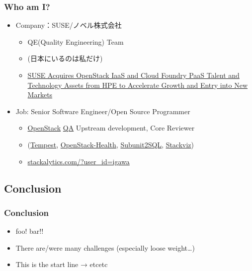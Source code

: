 \documentclass[aspectratio=169,11pt,hyperref={colorlinks=true}]{beamer}
\begin{document}
\begin{frame}
  \frametitle{Who am I?}
  \begin{itemize}
    \item Company：SUSE/ノベル株式会社
      \begin{itemize}
        \item QE(Quality Engineering) Team
        \item[] (日本にいるのは私だけ)
        \item \href{https://www.suse.com/newsroom/post/2016/suse-acquires-openstack-iaas-and-cloud-foundry-paas-talent-and-technology-assets-from-hpe-to-accelerate-growth-and-entry-into-new-markets/}{SUSE Acquires OpenStack IaaS and Cloud Foundry PaaS Talent and Technology Assets from HPE to Accelerate Growth and Entry into New Markets}
      \end{itemize}
    \item Job: Senior Software Engineer/Open Source Programmer
      \begin{itemize}
        \item \href{https://www.openstack.org/}{OpenStack}
         \href{https://wiki.openstack.org/wiki/QA}{QA} Upstream development, Core Reviewer
        \item[] (\href{https://docs.openstack.org/developer/tempest/}{Tempest},
         \href{http://status.openstack.org/openstack-health/}{OpenStack-Health},
         \href{https://docs.openstack.org/developer/subunit2sql/}{Subunit2SQL},
         \href{https://docs.openstack.org/developer/stackviz/}{Stackviz})
        \item \href{http://stackalytics.com/?user_id=igawa&release=all&metric=all}{stackalytics.com/?user\_id=igawa}
      \end{itemize}
  \end{itemize}
\end{frame}


\subsection{Conclusion}
\begin{frame}
\frametitle{Conclusion}
  \begin{itemize}
    \item foo! bar!!
    \item There are/were many challenges (especially loose weight\ldots)
    \item This is the start line →  etcetc
  \end{itemize}
\end{frame}
\end{document}
